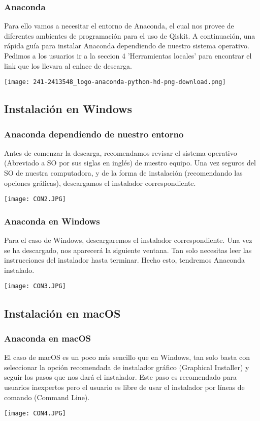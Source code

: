 \documentclass[spanish]{beamer}
\begin{document}
\newpage
\begin{frame}\frametitle{Anaconda}
\setlength{\parskip}{5mm}\justify
Para ello vamos a necesitar el entorno de Anaconda, el cual nos provee de diferentes ambientes de programación para el uso de Qiskit. A continuación, una rápida guía para instalar Anaconda dependiendo de nuestro sistema operativo. Pedimos a los usuarios ir a la seccion 4 'Herramientas locales' para encontrar el link que los llevara al enlace de descarga.

\centering\texttt{[image: 241-2413548\_logo-anaconda-python-hd-png-download.png]}
\end{frame}
\newpage\subsection{Instalación en Windows}
\begin{frame}\frametitle{Anaconda dependiendo de nuestro entorno}
\setlength{\parskip}{5mm}\justify
Antes de comenzar la descarga, recomendamos revisar el sistema operativo (Abreviado a SO por sus siglas en inglés) de nuestro equipo. Una vez seguros del SO de nuestra computadora, y de la forma de instalación (recomendando las opciones gráficas), descargamos el instalador correspondiente.

\centering\texttt{[image: CON2.JPG]}

\end{frame}
\newpage
\begin{frame}\frametitle{Anaconda en Windows}
\setlength{\parskip}{5mm}\justify
Para el caso de Windows, descargaremos el instalador correspondiente. Una vez se ha descargado, nos aparecerá la siguiente ventana. Tan solo necesitas leer las instrucciones del instalador hasta terminar. Hecho esto, tendremos Anaconda instalado.

\centering\texttt{[image: CON3.JPG]}

\end{frame}
\newpage\subsection{Instalación en macOS}
\begin{frame}\frametitle{Anaconda en macOS}
\setlength{\parskip}{5mm}\justify
El caso de macOS es un poco más sencillo que en Windows, tan solo basta con seleccionar la opción recomendada de instalador gráfico (Graphical Installer) y seguir los pasos que nos dará el instalador. Este paso es recomendado para usuarios inexpertos pero el usuario es libre de usar el instalador por líneas de comando (Command Line).

\centering\texttt{[image: CON4.JPG]}

\end{frame}
\end{document}
